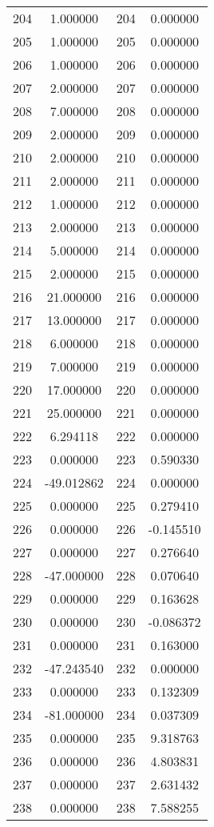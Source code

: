 \documentclass[12pt]{article}
\begin{document}
\begin{longtable}{@{}cccc@{}}
204 & 1.000000 & 204 & 0.000000 \\
205 & 1.000000 & 205 & 0.000000 \\
206 & 1.000000 & 206 & 0.000000 \\
207 & 2.000000 & 207 & 0.000000 \\
208 & 7.000000 & 208 & 0.000000 \\
209 & 2.000000 & 209 & 0.000000 \\
210 & 2.000000 & 210 & 0.000000 \\
211 & 2.000000 & 211 & 0.000000 \\
212 & 1.000000 & 212 & 0.000000 \\
213 & 2.000000 & 213 & 0.000000 \\
214 & 5.000000 & 214 & 0.000000 \\
215 & 2.000000 & 215 & 0.000000 \\
216 & 21.000000 & 216 & 0.000000 \\
217 & 13.000000 & 217 & 0.000000 \\
218 & 6.000000 & 218 & 0.000000 \\
219 & 7.000000 & 219 & 0.000000 \\
220 & 17.000000 & 220 & 0.000000 \\
221 & 25.000000 & 221 & 0.000000 \\
222 & 6.294118 & 222 & 0.000000 \\
223 & 0.000000 & 223 & 0.590330 \\
224 & -49.012862 & 224 & 0.000000 \\
225 & 0.000000 & 225 & 0.279410 \\
226 & 0.000000 & 226 & -0.145510 \\
227 & 0.000000 & 227 & 0.276640 \\
228 & -47.000000 & 228 & 0.070640 \\
229 & 0.000000 & 229 & 0.163628 \\
230 & 0.000000 & 230 & -0.086372 \\
231 & 0.000000 & 231 & 0.163000 \\
232 & -47.243540 & 232 & 0.000000 \\
233 & 0.000000 & 233 & 0.132309 \\
234 & -81.000000 & 234 & 0.037309 \\
235 & 0.000000 & 235 & 9.318763 \\
236 & 0.000000 & 236 & 4.803831 \\
237 & 0.000000 & 237 & 2.631432 \\
238 & 0.000000 & 238 & 7.588255 \\

\end{longtable}
\end{document}
